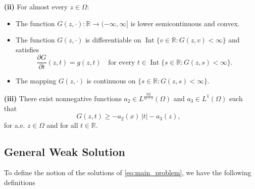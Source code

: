 \documentclass[11pt]{article}
\newcommand{\om} {\Omega}
\newcommand{\real}{\mathbb{R}}
\begin{document}
\medskip

 \textbf{(ii)} For almost every $z \in \Omega$:
\begin{itemize}
  \item[(a)] The function $G(z,\cdot) : \mathbb{R} \to (-\infty,\infty]$ is lower semicontinuous and convex.
  \item[(b)] The function $G(z,\cdot)$ is differentiable on $\operatorname{Int}\{ v \in \mathbb{R} : G(z,v) < \infty \}$ and satisfies
  \begin{equation*}
\frac{\partial G}{\partial t}(z,t) = g(z,t)
  \quad \text{for every } t \in \operatorname{Int}\{ s \in \mathbb{R} : G(z,s) < \infty \}.
  \end{equation*}
  \item[(c)] The mapping $G(z,\cdot)$ is continuous on $\{ s \in \mathbb{R} : G(z,s) < \infty \}$.
\end{itemize}

\medskip

 \textbf{(iii)} There exist nonnegative functions $a_2\in L^{\frac{2Q}{Q+2}}(\Omega)$ and $a_3 \in L^1(\Omega)$ such that
\begin{equation*}
G(z,t) \ge - a_2(x)\,|t| - a_3(z),
\end{equation*}
for a.e. $z \in \om$ and for all $t \in \real$.





\subsection{General Weak Solution}
To define the notion of the solutions of \eqref{eq:main_problem}, we have the following definitions 
\end{document}
